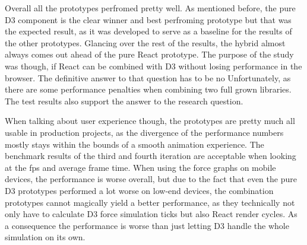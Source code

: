 Overall all the prototypes perfromed pretty well. As mentioned before, the pure D3 component is the clear winner and best perfroming prototype but that was the expected result, as it was developed to serve as a baseline for the results of the other prototypes. Glancing over the rest of the results, the hybrid almost always comes out ahead of the pure React prototype. The purpose of the study was though, if React can be combined with D3 without losing performance in the browser. The definitive answer to that question has to be no Unfortunately, as there are some performance penalties when combining two full grown libraries. The test results also support the answer to the research question.

When talking about user experience though, the prototypes are pretty much all usable in production projects, as the divergence of the performance numbers mostly stays within the bounds of a smooth animation experience. The benchmark results of the third and fourth iteration are acceptable when looking at the fps and average frame time. When using the force graphs on mobile devices, the performance is worse overall, but due to the fact that even the pure D3 prototypes performed a lot worse on low-end devices, the combination prototypes cannot magically yield a better performance, as they technically not only have to calculate D3 force simulation ticks but also React render cycles. As a consequence the performance is worse than just letting D3 handle the whole simulation on its own. 

